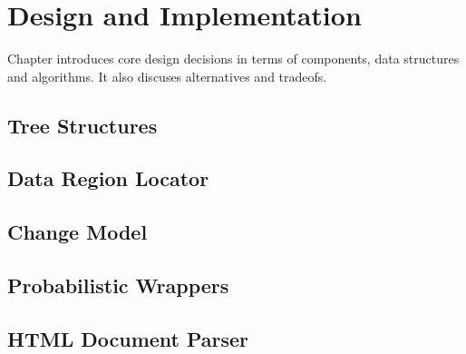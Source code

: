 \chapter{Design and Implementation}


Chapter introduces core design decisions in terms of components, data structures and algorithms. It also discuses alternatives and tradeofs.

\section{Tree Structures}
\section{Data Region Locator}
\section{Change Model}
\section{Probabilistic Wrappers}
\section{HTML Document Parser}


